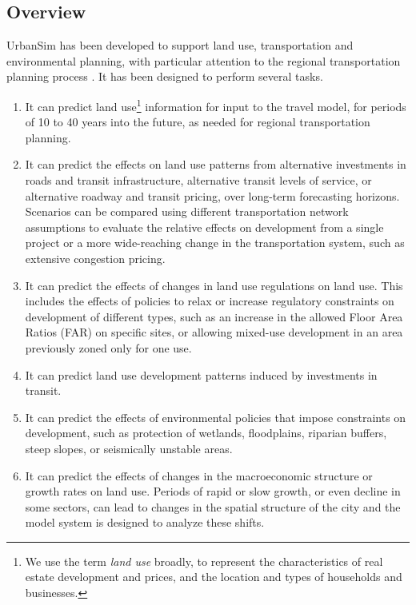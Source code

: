 \subsection{Overview}


UrbanSim has been developed to support land use, transportation and environmental planning, with particular attention to the regional transportation planning process \citep{waddell-japa-2002, waddell-tra-2007, waddell-tr-2011}. It has been designed to perform several tasks.

\begin{enumerate}
\item It can predict land use\footnote{We use the term \emph{land use} broadly, to represent the characteristics of real estate development and prices, and the location and types of households and businesses.} information for input to the travel model, for periods of 10 to 40 years into the future, as needed for regional transportation planning.

\item It can predict the effects on land use patterns from alternative investments in roads and transit infrastructure, alternative transit levels of service, or alternative roadway and transit pricing, over long-term forecasting horizons. Scenarios can be compared using different transportation network assumptions to evaluate the relative effects on development from a single project or a more wide-reaching change in the transportation system, such as extensive congestion pricing.

\item It can predict the effects of changes in land use regulations on land use. This includes the effects of policies to relax or increase regulatory constraints on development of different types, such as an increase in the allowed Floor Area Ratios (FAR) on specific sites, or allowing mixed-use development in an area previously zoned only for one use.

\item It can predict land use development patterns induced by investments in transit.

\item It can predict the effects of environmental policies that impose constraints on development, such as protection of wetlands, floodplains, riparian buffers, steep slopes, or seismically unstable areas.

\item It can predict the effects of changes in the macroeconomic structure or growth rates on land use. Periods of rapid or slow growth, or even decline in some sectors, can lead to changes in the spatial structure of the city and the model system is designed to analyze these shifts.


\end{enumerate}
